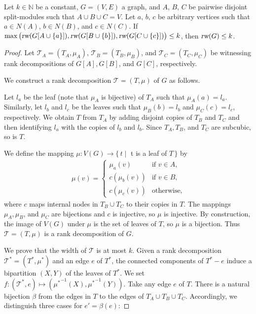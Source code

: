 \documentclass{llncs}
\newcommand{\Nat}{\mathbb{N}}
\newcommand{\SB}{\{\,} \newcommand{\SM}{\;{|}\;} \newcommand{\SE}{\,\}}
\def\sm{split-module}
\newcommand{\rw}{\text{\normalfont\slshape rw}}
\begin{document}
{\begin{lemma}\label{lem:unionrw}
Let $k\in \Nat$ be a constant, $G=(V,E)$ a graph, and  $A$, $B$, $C$ be pairwise disjoint \sm s such that $A\cup B\cup C=V$. Let $a$, $b$, $c$ be arbitrary vertices such that $a\in N(A)$, $b\in N(B)$, and $c\in N(C)$. 
If $\max \big(\rw(G[A\cup \{a\}]),\rw(G[B\cup \{b\}]),\rw(G[C\cup \{c\}])\big)\le k$, then $\rw(G)\le k$.
\end{lemma}

\begin{proof}
Let
  $\mathcal{T}_{A} = (T_{A}, \mu_{A})$, $\mathcal{T}_{B}
 = (T_{B},
  \mu_{B})$, and $\mathcal{T}_{C} = (T_{C}, \mu_{C})$
 be witnessing rank
  decompositions of $G[A], G[B]$, and $G[C]$,
 respectively.
 
 We construct a rank decomposition $\mathcal{T} = (T, \mu)$ of $G$ as follows.  
 
 Let $l_{a}$ be the leaf (note that $\mu_{A}$ is
 bijective) of $T_{A}$ such that $\mu_{A}(a) = l_{a}$. 
Similarly, let $l_b$ and $l_c$ be the leaves such that $\mu_B(b)=l_b$ and $\mu_C(c)=l_c$, respectively.  
 We obtain $T$ from $T_{A}$ by adding disjoint copies of
 $T_{B}$ and $T_{C}$ and then identifying $l_{a}$ with the copies of
 $l_{b}$ and $l_{b}$. Since $T_{A}, T_{B}$, and $T_{C}$ are subcubic, so
 is $T$.
 
 We define the mapping $\mu: V(G) \rightarrow \SB t
  \SM $ t
 is a leaf of $T \SE$ by
  \begin{align*}
    \mu(v) = \begin{cases}
      \mu_{a}(v) &\text{if $v \in A$,} \\
      c(\mu_{b}(v)) &\text{if $v \in B$,} \\
      c(\mu_{c}(v)) &\text{otherwise,}
    \end{cases}
  \end{align*}
  where $c$ maps internal nodes in $T_{B} \cup T_{C}$ to their copies in
  $T$. The mappings $\mu_{A}, \mu_{B}$, and $\mu_{C}$ are
  bijections and $c$ is injective, so $\mu$ is injective. By
  construction, the image of $V(G)$ under $\mu$ is the set of
  leaves of $T$, so $\mu$ is a bijection. Thus $\mathcal{T} = (T,
  \mu)$ is a rank decomposition of $G$.

We prove that the width of $\mathcal{T}$ is at most $k$. Given a rank
  decomposition $\mathcal{T}^* = (T^*, \mu^*)$ and an edge $e$ of $T^*$, the
  connected components of $T^* - e$ induce a bipartition $(X, Y)$
  of the leaves of $T^*$. We set $f: (\mathcal{T}^*, e) \mapsto
  ({\mu^*}^{-1}(X), {\mu^*}^{-1}(Y))$. Take any edge $e$ of $T$. There is a
  natural bijection $\beta$ from the edges in $T$ to the edges of $T_{A} \cup
  T_{B} \cup T_{C}$. Accordingly, we distinguish three cases for $e ' =
  \beta(e)$:
 

\end{proof}}
\end{document}
